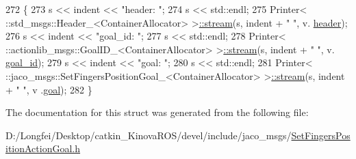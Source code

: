 \begin{DoxyCode}
272   \{
273     s << indent << \textcolor{stringliteral}{"header: "};
274     s << std::endl;
275     Printer< ::std\_msgs::Header\_<ContainerAllocator> >\hyperlink{structros_1_1message__operations_1_1Printer_3_01_1_1jaco__msgs_1_1SetFingersPositionActionGoal__33ea544897d72e7b50aaaf79efc6fd71_a403e89758ee1b13c990abfd8bbb2ff9e}{::stream}(s, indent + \textcolor{stringliteral}{"  "}, v.
      \hyperlink{structjaco__msgs_1_1SetFingersPositionActionGoal___aaaa32a1863202d0223d4e50696b4c64b}{header});
276     s << indent << \textcolor{stringliteral}{"goal\_id: "};
277     s << std::endl;
278     Printer< ::actionlib\_msgs::GoalID\_<ContainerAllocator> >\hyperlink{structros_1_1message__operations_1_1Printer_3_01_1_1jaco__msgs_1_1SetFingersPositionActionGoal__33ea544897d72e7b50aaaf79efc6fd71_a403e89758ee1b13c990abfd8bbb2ff9e}{::stream}(s, indent + \textcolor{stringliteral}{"  "}, v.
      \hyperlink{structjaco__msgs_1_1SetFingersPositionActionGoal___a261bcecfa80d718de47ac2c4c3a479fb}{goal\_id});
279     s << indent << \textcolor{stringliteral}{"goal: "};
280     s << std::endl;
281     Printer< ::jaco\_msgs::SetFingersPositionGoal\_<ContainerAllocator> >\hyperlink{structros_1_1message__operations_1_1Printer_3_01_1_1jaco__msgs_1_1SetFingersPositionActionGoal__33ea544897d72e7b50aaaf79efc6fd71_a403e89758ee1b13c990abfd8bbb2ff9e}{::stream}(s, indent + \textcolor{stringliteral}{"  "}, v
      .\hyperlink{structjaco__msgs_1_1SetFingersPositionActionGoal___a813e7ec249b22368dc97bde83fa86fb0}{goal});
282   \}
\end{DoxyCode}


The documentation for this struct was generated from the following file\+:\begin{DoxyCompactItemize}
\item 
D\+:/\+Longfei/\+Desktop/catkin\+\_\+\+Kinova\+R\+O\+S/devel/include/jaco\+\_\+msgs/\hyperlink{SetFingersPositionActionGoal_8h}{Set\+Fingers\+Position\+Action\+Goal.\+h}\end{DoxyCompactItemize}
